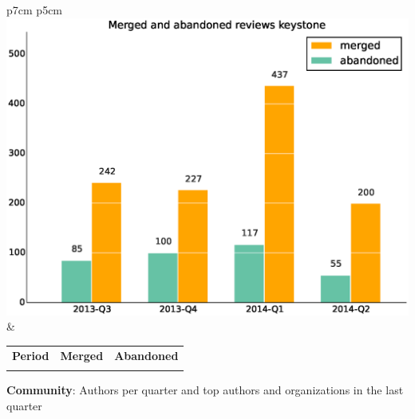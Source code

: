 \documentclass[a4wide,11pt]{report}
\begin{document}
\begin{tabular}{p{7cm} p{5cm}}
    \vspace{0pt} 
    \includegraphics[scale=.35]{figs/submitted_reviewskeystone.eps}
    & 
    \vspace{0pt}
    \begin{tabular}{l|r|r|}%
    \bfseries Period & \bfseries Merged & \bfseries Abandoned %
    \csvreader[head to column names]{data/submitted_reviewskeystone.csv}{}%
    {\\ & \merged & \abandoned}
    \end{tabular}
\end{tabular}


\textbf{Community}: Authors per quarter and top authors and organizations in the last quarter
\end{document}
